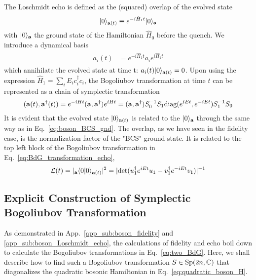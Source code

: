 The Loschmidt echo is defined as the (squared) overlap of the evolved state
\begin{eqnarray}\begin{aligned}
|0\rangle_{{\bf a}(t)}\equiv e^{-i\hat{H}_1t}|0\rangle_{\bf a}
\end{aligned}\end{eqnarray}
with $|0\rangle_{\bf a}$ the ground state of the Hamiltonian $\hat{H}_0$ before the quench. We introduce a dynamical basis
\begin{eqnarray}\begin{aligned}
a_i(t)&=e^{-i\hat{H}_1t}a_ie^{i\hat{H}_1t}
\end{aligned}\end{eqnarray}
which annihilate the evolved state at time t: $a_i(t)|0\rangle_{{\bf a}(t)}=0$. Upon using the expression $\hat{H}_1=\sum_iE_ic_i^\dagger c_i$, the Bogoliubov transformation at time $t$ can be represented as a chain of symplectic transformation
\begin{eqnarray}\begin{aligned}
\label{eq:BdG_transformation_echo}
({\bf a}(t),{\bf a}^\dagger(t))=e^{-iHt}
({\bf a} , {\bf a}^\dagger)e^{iHt}=({\bf a},{\bf a}^\dagger)S_0^{-1}S_1\text{diag}(e^{iEt},e^{-iEt})S_1^{-1}S_0
\end{aligned}\end{eqnarray}
It is evident that the evolved state $|0\rangle_{{\bf a}(t)}$ is related to the $|0\rangle_{{\bf a}}$ through the same way as in Eq.~\eqref{eq:boson_BCS_gnd}. The overlap, as we have seen in the fidelity case, is the normalization factor of the "BCS" ground state. It is related to the top left block of the Bogoliubov transformation in Eq.~\eqref{eq:BdG_transformation_echo},
\begin{eqnarray}\begin{aligned}
\label{eq:echo_t}
\mathcal{L}(t)=|_{\bf a}\langle0|0\rangle_{{\bf a}(t)}|^2=|\text{det}(u_1^\dagger e^{iEt}u_1-v_1^\dagger e^{-iEt}v_1)|^{-1}
\end{aligned}\end{eqnarray}

\subsection{Explicit Construction of Symplectic Bogoliubov Transformation}
\label{app_sub:construction_Bogoliubov}

As demonstrated in App.~\ref{app_sub:boson_fidelity} and \ref{app_sub:boson_Loschmidt_echo}, the calculations of fidelity and echo boil down to calculate the Bogoliubov transformations in Eq.~\eqref{eq:two_BdG}. Here, we shall describe how to find such a Bogoliubov transformation $S \in {\rm Sp}(2n, \mathbb{C})$ that diagonalizes the quadratic bosonic Hamiltonian in Eq.~\eqref{eq:quadratic_boson_H}. 

